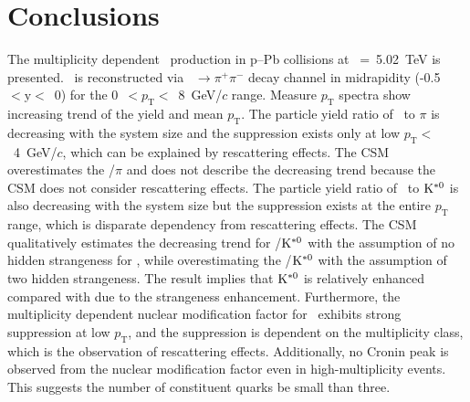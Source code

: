 
\section{Conclusions}
\label{sec:summary}

The multiplicity dependent \fzero~production in p--Pb collisions at \snn~=~5.02~TeV is presented. \fzero~is reconstructed via \fzero~$\rightarrow\pi^{+}\pi^{-}$ decay channel in midrapidity (-0.5~$<\mathrm{y}<$~0) for the 0~$<p_{\mathrm{T}}<$~8~GeV/$c$ range. Measure $p_{\mathrm{T}}$ spectra show increasing trend of the yield and mean $p_{\mathrm{T}}$. The particle yield ratio of \fzero~to $\pi$ is decreasing with the system size and the suppression exists only at low $p_{\mathrm{T}}<$~4~GeV/$c$, which can be explained by rescattering effects. The CSM overestimates the \fzero/$\pi$ and does not describe the decreasing trend because the CSM does not consider rescattering effects. The particle yield ratio of \fzero~to $\rm{}K^{*0}$ is also decreasing with the system size but the suppression exists at the entire $p_{\mathrm{T}}$ range, which is disparate dependency from rescattering effects. The CSM qualitatively estimates the decreasing trend for \fzero/$\rm{}K^{*0}$ with the assumption of no hidden strangeness for \fzero, while overestimating the \fzero/$\rm{}K^{*0}$ with the assumption of two hidden strangeness. The result implies that $\rm{}K^{*0}$ is relatively enhanced compared with \fzero due to the strangeness enhancement. Furthermore, the multiplicity dependent nuclear modification factor for \fzero~exhibits strong suppression at low $p_{\mathrm{T}}$, and the suppression is dependent on the multiplicity class, which is the observation of rescattering effects. Additionally, no Cronin peak is observed from the nuclear modification factor even in high-multiplicity events. This suggests the number of constituent quarks be small than three.